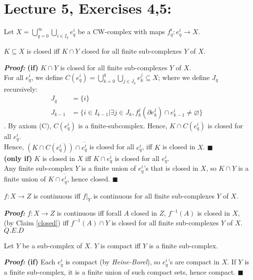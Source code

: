 \documentclass[11pt]{article}
\numberwithin{equation}{section}
\begin{document}
\section{\normalsize{Lecture 5, Exercises 4,5:}}
Let $X=\bigcup^{\infty}_{q=0}{\bigcup_{i\in I_q}{e_q^i}}$ be a CW-complex with maps $f_q^i:e_q^i\rightarrow X$. 
\begin{clm}\label{closed}
     $K\subseteq X$ is closed iff $K\cap Y$ closed for all finite sub-complexes $Y$ of $X$. 
\end{clm}
\textbf{\emph{Proof:}} \textbf{(if)} $K\cap Y$ is closed for all finite sub-complexes $Y$ of $X$. \\ For all $e_q^i$, we define $C(e_q^i)=\bigcup^{q}_{k=0}{\bigcup_{j\in J_k}{e_k^j}}\subseteq X$; where we define $J_q$ recursively: \begin{align*}
     J_q &=\{i\}\\ J_{k-1}&=\{i\in I_{k-1}|\exists j\in J_k, f_k^j(\partial e_k^j)\cap e_{k-1}^{i}\neq \varnothing\}\end{align*} . By axiom (C), $C(e_q^i)$ is a finite-subcomplex. Hence, $K\cap C(e_q^i)$ is closed for all $e_q^i$. \\ Hence, $(K\cap C(e_q^i))\cap \overline{e_q^i}$ is closed for all $e_q^i$, iff $K$ is closed in $X$. $\blacksquare$ \\[8pt] \textbf{(only if)} $K$ is closed in $X$ iff $K\cap \overline{e_q^i}$ is closed for all $e_q^i$. \\ Any finite sub-complex $Y$ is a finite union of $e_q^i$'s that is closed in $X$, so $K\cap Y$ is a finite union of $K\cap \overline{e_q^i}$, hence closed. $\blacksquare$
\begin{cor}
    $f:X\rightarrow Z$ is continuous iff $f|_Y$ is continuous for all finite sub-complexes $Y$ of $X$.  
\end{cor}
\textbf{\emph{Proof:}} $f:X\rightarrow Z$ is continuous iff forall $A$ closed in $Z$, $f^{-1}(A)$ is closed in $X$, (by Claim \ref{closed}) iff $f^{-1}(A)\cap Y$ is closed for all finite sub-complexes $Y$ of $X$. \\ $Q.E.D$ 
\begin{clm}\label{compact}
    Let $Y$ be a sub-complex of $X$. $Y$ is compact iff $Y$ is a finite sub-complex.
\end{clm}
\textbf{\emph{Proof:}} \textbf{(if)} Each $e_q^i$ is compact (by \emph{Heine-Borel}), so $e_q^i$'s are compact in $X$. If $Y$ is a finite sub-complex, it is a finite union of such compact sets, hence compact. $\blacksquare$ \\ [8pt]
\end{document}
